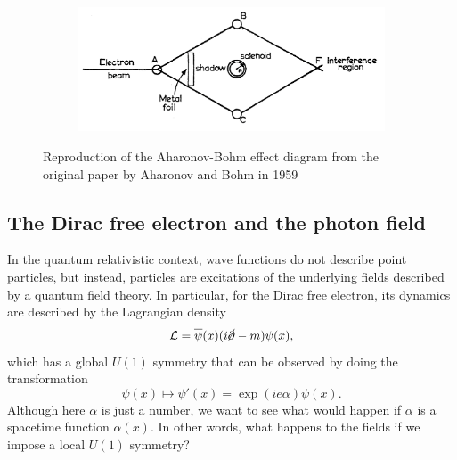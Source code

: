\documentclass[a4paper]{report}
\begin{document}
\begin{spacing}{1.1}
\begin{figure}[h!]
\centering
\begin{subfigure}{0.6\textwidth}
\includegraphics[width=\linewidth]{ABeffect.png} %
\end{subfigure}
\caption{Reproduction of the Aharonov-Bohm effect diagram from the original paper by Aharonov and Bohm in 1959 \cite{aharonov1959significance} \label{fig:ABeffect}}
\end{figure}






\subsection{The Dirac free electron and the photon field}

In the quantum relativistic context, wave functions do not describe point particles, but instead, particles are excitations of the underlying fields described by a quantum field theory. In particular, for the Dirac free electron, its dynamics are described by the Lagrangian density
\begin{equation}
    \mathcal{L} = \overline{\psi}(x)(i\cancel\partial - m)\psi(x),
\end{equation}
which has a global $U(1)$ symmetry that can be observed by doing the transformation
\begin{equation}
    \psi(x) \mapsto \psi'(x) = \exp(ie\alpha)\psi(x).
\end{equation}
Although here $\alpha$ is just a number, we want to see what would happen if $\alpha$ is a spacetime function $\alpha(x)$. In other words, what happens to the fields if we impose a local $U(1)$ symmetry?


\end{spacing}
\end{document}
